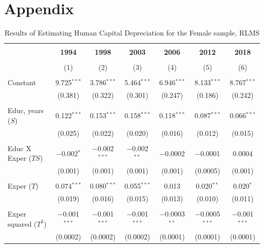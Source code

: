 \documentclass[12pt,a4paper]{article}
\numberwithin{equation}{section}
\begin{document}
\printbibliography

\newpage
\section*{Appendix}
%

\setcounter{table}{0}
\renewcommand{\thetable}{A\arabic{table}}


\begin{table}[!htbp] \centering 
\caption{Results of Estimating Human Capital Depreciation for the Female sample, RLMS} 
	\label{tab:A1}
\begin{tabular}{@{\extracolsep{5pt}}lcccccc} 
\\[-1.8ex]\hline 
\hline \\[-1.8ex] 
& \textbf{1994} & \textbf{1998} & \textbf{2003} & \textbf{2006} & \textbf{2012} & \textbf{2018} \\ 
\\[-1.8ex] & (1) & (2) & (3) & (4) & (5) & (6)\\ 
\hline \\[-1.8ex] 
 Constant & 9.725$^{***}$ & 3.786$^{***}$ & 5.464$^{***}$ & 6.946$^{***}$ & 8.133$^{***}$ & 8.767$^{***}$ \\ 
  & (0.381) & (0.322) & (0.301) & (0.247) & (0.186) & (0.242) \\ 
  & & & & & & \\ 
 Educ, years ($S$) & 0.122$^{***}$ & 0.153$^{***}$ & 0.158$^{***}$ & 0.118$^{***}$ & 0.087$^{***}$ & 0.066$^{***}$ \\ 
  & (0.025) & (0.022) & (0.020) & (0.016) & (0.012) & (0.015) \\ 
  & & & & & & \\ 
 Educ X Exper ($TS$) & $-$0.002$^{*}$ & $-$0.002$^{***}$ & $-$0.002$^{**}$ & $-$0.0002 & $-$0.0001 & 0.0004 \\ 
  & (0.001) & (0.001) & (0.001) & (0.001) & (0.0005) & (0.001) \\ 
  & & & & & & \\ 
 Exper ($T$) & 0.074$^{***}$ & 0.080$^{***}$ & 0.055$^{***}$ & 0.013 & 0.020$^{**}$ & 0.020$^{*}$ \\ 
  & (0.019) & (0.016) & (0.015) & (0.013) & (0.010) & (0.011) \\ 
  & & & & & & \\ 
 Exper squared ($T^2$) & $-$0.001$^{***}$ & $-$0.001$^{***}$ & $-$0.001$^{***}$ & $-$0.0003$^{**}$ & $-$0.0005$^{***}$ & $-$0.001$^{***}$ \\ 
  & (0.0002) & (0.0002) & (0.0002) & (0.0001) & (0.0001) & (0.0001) \\ 

\end{tabular}
\end{table}
\end{document}

